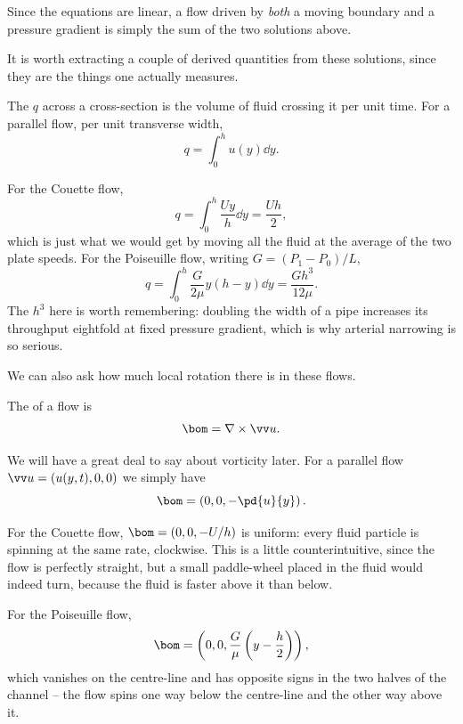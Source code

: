 Since the equations are linear, a flow driven by \emph{both} a moving boundary and a pressure gradient is simply the sum of the two solutions above.

It is worth extracting a couple of derived quantities from these solutions, since they are the things one actually measures.

\begin{definition}
	The  $q$ across a cross-section is the volume of fluid crossing it per unit time. For a parallel flow, per unit transverse width,
	$$
	q = \int_0^h u(y) \dd y.
	$$
\end{definition}

\begin{example}
	For the Couette flow,
	$$
	q = \int_0^h \frac{Uy}{h} \dd y = \frac{Uh}{2},
	$$
	which is just what we would get by moving all the fluid at the average of the two plate speeds. For the Poiseuille flow, writing $G = (P_1 - P_0)/L$,
	$$
	q = \int_0^h \frac{G}{2\mu} y(h-y) \dd y = \frac{Gh^3}{12\mu}.
	$$
	The $h^3$ here is worth remembering: doubling the width of a pipe increases its throughput eightfold at fixed pressure gradient, which is why arterial narrowing is so serious.
\end{example}

We can also ask how much local rotation there is in these flows.

\begin{definition}[Vorticity]
	The  of a flow is
	$$
	\bom = \nabla \times \vv u.
	$$
\end{definition}

We will have a great deal to say about vorticity later. For a parallel flow $\vv u = (u(y,t), 0, 0)$ we simply have
$$
\bom = \left(0, 0, -\pd{u}{y}\right).
$$

\begin{example}
	For the Couette flow, $\bom = (0, 0, -U/h)$ is uniform: every fluid particle is spinning at the same rate, clockwise. This is a little counterintuitive, since the flow is perfectly straight, but a small paddle-wheel placed in the fluid would indeed turn, because the fluid is faster above it than below.

	For the Poiseuille flow,
	$$
	\bom = \left(0, 0, \frac{G}{\mu}\left(y - \frac{h}{2}\right)\right),
	$$
	which vanishes on the centre-line and has opposite signs in the two halves of the channel -- the flow spins one way below the centre-line and the other way above it.
\end{example}

